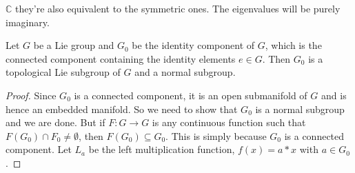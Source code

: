         $\mathbb{C}$ they're also equivalent to the symmetric ones. The
        eigenvalues will be purely imaginary.
        \par\hfill\par
        \begin{theorem}
            Let $G$ be a Lie group and $G_{0}$ be the identity component
            of $G$, which is the connected component containing the
            identity elements $e\in{G}$. Then $G_{0}$ is a topological
            Lie subgroup of $G$ and a normal subgroup.
        \end{theorem}
        \begin{proof}
            Since $G_{0}$ is a connected component, it is an open
            submanifold of $G$ and is hence an embedded manifold. So we
            need to show that $G_{0}$ is a normal subgroup and we are
            done. But if $F:G\rightarrow{G}$ is any continuous function
            such that $F(G_{0})\cap{F}_{0}\ne\emptyset$, then
            $F(G_{0})\subseteq{G}_{0}$. This is simply because $G_{0}$
            is a connected component. Let $L_{a}$ be the left
            multiplication function, $f(x)=a*x$ with $a\in{G}_{0}$.
        \end{proof}
